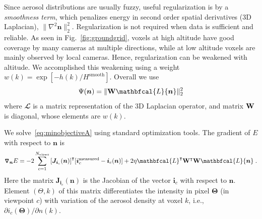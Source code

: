 \documentclass[10pt,letterpaper]{article}
\newcommand{\Grad}[1]{\bm{\triangledown_{#1}}}
\newcommand{\transpose}[1]{{#1}^\intercal}
\newcommand{\Laplacian}{\mathbfcal{L}}
\begin{document}
Since aerosol distributions are usually fuzzy, useful regularization
is by a {\em smoothness term}, which penalizes energy in second order
spatial derivatives (3D Laplacian), $\| \nabla^2{\bm
  n}\|^2_2$. Regularization is not required when data is sufficient
and reliable. As seen in Fig.~\ref{fig:groundgrid}, voxels at high
altitude have good coverage by many cameras at multiple directions,
while at low altitude voxels are mainly observed by local
cameras. Hence, regularization can be weakened with altitude. We
accomplished this weakening using a weight
$w(k)=\exp\left[-h(k)/H^\mathrm{smooth}\right]$.  Overall we use
\begin{equation}
  \label{eq:regularizer}
  \Psi({\bm n}) = \| {\bf W} \Laplacian{\bm n}\|^2_2
\end{equation}
where $\Laplacian$ is a matrix representation of the 3D Laplacian
operator, and matrix ${\bf W}$ is diagonal, whose elements are $w(k)$.

We solve~\cref{eq:minobjectiveA} using standard optimization tools.
The gradient of $E$ with respect to ${\bm n}$ is
\begin{align}
  \Grad{{\bm n}} E = -2\sum_{c=1}^{N_{\rm views}}
  \transpose{\left[{\bm J}_{{\bm i}_c}({\bm n})\right]} [{\bm i}^{\rm
    measured}_c - {\bm i}_c({\bm n})] + 2 \eta
  \transpose{\Laplacian}\transpose{{\bf W}}{\bf W}\Laplacian{\bm n}
  \;.
  \label{eq:gradient1}
\end{align}
Here the matrix ${\bm J}_{{\bm i}_c}({\bm n})$ is the Jacobian of the
vector ${\bm i}_c$ with respect to ${\bm n}$.  Element $(\Theta,k)$ of
this matrix differentiates the intensity in pixel ${\bm \Theta}$ (in
viewpoint $c$) with variation of the aerosol density at voxel $k$,
i.e., $\partial i_c({\bm \Theta})/\partial{n(k)}$.
\end{document}
